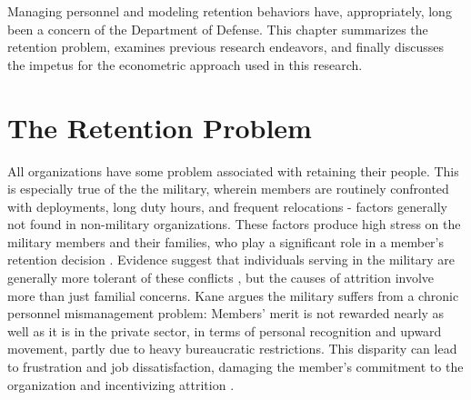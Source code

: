 \documentclass[12pt,letterpaper,toc=flat,oneside]{report}
\theoremstyle{definition}
\theoremstyle{definition}
\theoremstyle{definition}
\theoremstyle{remark}
\begin{document}
Managing personnel and modeling retention behaviors have, appropriately,
long been a concern of the Department of Defense. This chapter
summarizes the retention problem, examines previous research endeavors,
and finally discusses the impetus for the econometric approach used in
this research.

\hypertarget{the-retention-problem}{%
\section{The Retention Problem}\label{the-retention-problem}}

All organizations have some problem associated with retaining their
people. This is especially true of the the military, wherein members are
routinely confronted with deployments, long duty hours, and frequent
relocations - factors generally not found in non-military organizations.
These factors produce high stress on the military members and their
families, who play a significant role in a member's retention decision
\cite{fugita-lakhani-1991}. Evidence suggest that individuals serving in
the military are generally more tolerant of these conflicts
\cite{capon-etal-2007}, but the causes of attrition involve more than
just familial concerns. Kane \cite{kane-2012} argues the military
suffers from a chronic personnel mismanagement problem: Members' merit
is not rewarded nearly as well as it is in the private sector, in terms
of personal recognition and upward movement, partly due to heavy
bureaucratic restrictions. This disparity can lead to frustration and
job dissatisfaction, damaging the member's commitment to the
organization and incentivizing attrition \cite{capon-etal-2007}.
\end{document}
